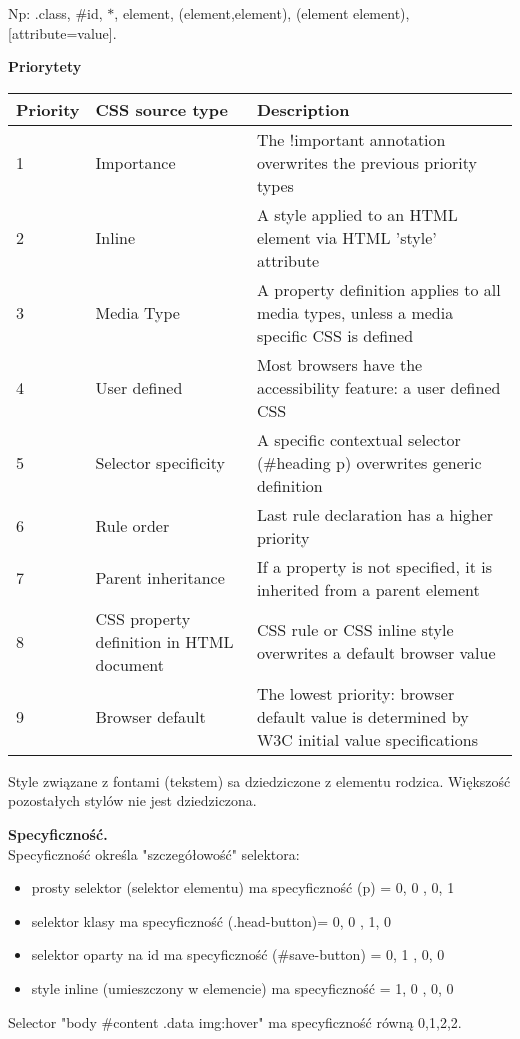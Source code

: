 \documentclass[../main.tex]{subfiles}
\begin{document}
    Np: .class, \#id, $*$, element, (element,element), (element element), [attribute=value].

    \textbf{Priorytety}
    \begin{table}[H]
        \begin{center}
            \begin{tabular}{|p{2cm}|p{4cm}|p{8cm}|}
                \hline
                \textbf{Priority} & \textbf{CSS source type} & \textbf{Description}\\
                \hline
                \hline
                1 & Importance & The !important annotation overwrites the previous priority types\\
                \hline
                2 & Inline & A style applied to an HTML element via HTML 'style' attribute\\
                \hline
                3 & Media Type & A property definition applies to all media types, unless a media specific CSS is defined\\
                \hline
                4 & User defined & Most browsers have the accessibility feature: a user defined CSS\\
                \hline
                5 & Selector specificity & A specific contextual selector (\#heading p) overwrites generic definition\\
                \hline
                6 & Rule order & Last rule declaration has a higher priority\\
                \hline
                7 & Parent inheritance & If a property is not specified, it is inherited from a parent element\\
                \hline
                8 & CSS property definition in HTML document & CSS rule or CSS inline style overwrites a default browser value\\
                \hline
                9 & Browser default & The lowest priority: browser default value is determined by W3C initial value specifications\\
                \hline
            \end{tabular}
        \end{center}
    \end{table}
    Style związane z fontami (tekstem) sa dziedziczone z elementu rodzica. Większość pozostałych stylów nie jest dziedziczona.

    \textbf{Specyficzność.}\\

    Specyficzność określa "szczegółowość" selektora:
    \begin{itemize}
        \item prosty selektor (selektor elementu) ma specyficzność (p) = 0, 0 , 0, 1
        \item selektor klasy ma specyficzność (.head-button)= 0, 0 , 1, 0
        \item selektor oparty na id ma specyficzność (\#save-button) = 0, 1 , 0, 0
        \item style inline (umieszczony w elemencie) ma specyficzność = 1, 0 , 0, 0
    \end{itemize}
    Selector "body \#content .data img:hover" ma specyficzność równą 0,1,2,2.
\end{document}
